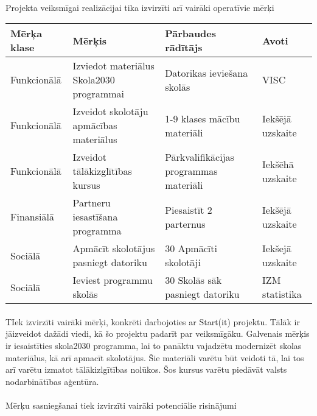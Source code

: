 \paragraph{}
Projekta veiksmīgai realizācijai tika izvirzīti arī vairāki operatīvie mērķi
\begin{table}[!ht]
    \centering
    \begin{tabular}{|l|p{6cm}|p{5cm}|p{2cm}|}
        \hline
        \textbf{Mērķa klase} & \textbf{Mērķis} & \textbf{Pārbaudes rādītājs} & \textbf{Avoti} \\
        \hline
        Funkcionālā & Izviedot materiālus Skola2030 programmai & Datorikas ieviešana skolās & VISC \\
        \hline
        Funkcionālā & Izveidot skolotāju apmācības materiālus & 1-9 klases mācību materiāli & Iekšējā uzskaite \\
        \hline
        Funkcionālā & Izveidot tālākizglītības kursus & Pārkvalifikācijas programmas materiāli & Iekšēhā uzskaite \\
        \hline
        Finansiālā & Partneru iesastīšana programma & Piesaistīt 2 parternus & Iekšējā uzskaite \\
        \hline
        Sociālā & Apmācīt skolotājus pasniegt datoriku & 30 Apmācīti skolotāji & Iekšejā uzskaite \\
        \hline
        Sociālā & Ieviest programmu skolās & 30 Skolās sāk pasniegt datoriku & IZM statistika \\
        \hline 
    \end{tabular}
\end{table}
\paragraph{}
TIek izvirzīti vairāki mērķi, konkrēti darbojoties ar Start(it) projektu. Tālāk ir jāizveidot dažādi viedi, kā
šo projektu padarīt par veiksmīgāku. Galvenais mērķis ir iesaistīties skola2030 programma, lai to panāktu vajadzētu
modernizēt skolas materiālus, kā arī apmacīt skolotājus. Šie materiāli varētu būt veidoti tā, lai tos arī varētu
izmatot tālākizlgītības nolūkos. Šos kursus varētu piedāvāt valsts nodarbinātības aģentūra.
\paragraph{}
Mērķu sasniegšanai tiek izvirzīti vairāki potenciālie risinājumi
